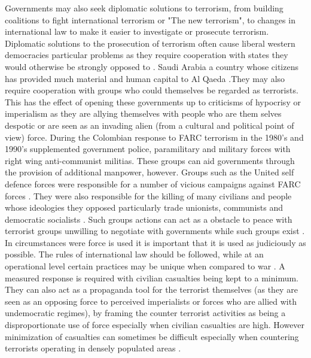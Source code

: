 Governments may also seek diplomatic solutions to terrorism, from building coalitions to fight international terrorism or "The new terrorism", to changes in international law to make it easier to investigate or prosecute terrorism. Diplomatic solutions to the prosecution of terrorism often cause liberal western democracies particular problems as they require cooperation with states they would otherwise be strongly opposed to \citep{jarvis2014critical}. Saudi Arabia a country whose citizens has provided much material and human capital to Al Qaeda \citep{abuza2003funding}.They may also require cooperation with groups who could themselves be regarded as terrorists. This has the effect of opening these governments up to criticisms of hypocrisy or imperialism as they are allying themselves with people who are them selves despotic or are seen as an invading alien (from a cultural and political point of view) force. During the Colombian response to FARC terrorism in the 1980's and 1990's supplemented government police, paramilitary and military forces with right wing anti-communist militias. These groups can aid governments through the provision of additional manpower, however. Groups such as the United self defence forces were responsible for a number of vicious campaigns against FARC forces \citep{ColombiaRightWingTerror}. They were also responsible for the killing of many civilians and people whose ideologies they opposed particularly trade unionists, communists and democratic socialists \citep{peceny2006farc}. Such groups actions can act as a obstacle to peace with terrorist groups unwilling to negotiate with governments while such groups exist \citep{ColombiaAUCFARC}.
\\
In circumstances were force is used it is important that it is used as judiciously as possible. The rules of international law should be followed, while at an operational level certain practices may be unique when compared to war \citep{roberts2002counter}. A measured response is required with civilian casualties being kept to a minimum. They can also act as a propaganda tool for the terrorist themselves (as they are seen as an opposing force to perceived imperialists or forces who are allied with undemocratic regimes), by framing the counter terrorist activities as being a disproportionate use of force especially when civilian casualties are high. However minimization of casualties can sometimes be difficult especially when countering terrorists operating in densely populated areas \citep{graham2009urban}.  
\\
